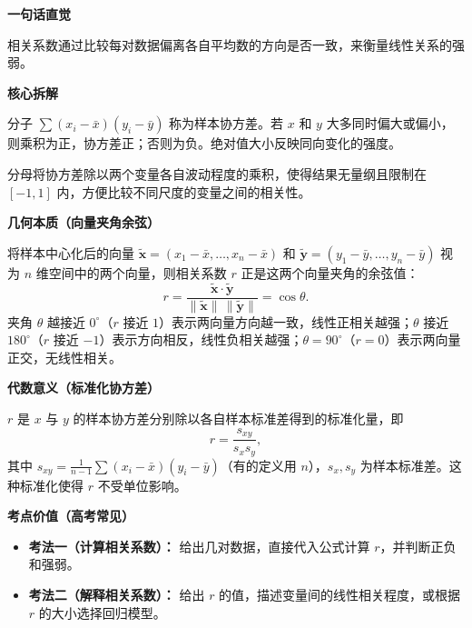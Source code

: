 \begin{explanationbox}
	\textbf{\textcolor{CExplanation}{一句话直觉}}

	相关系数通过比较每对数据偏离各自平均数的方向是否一致，来衡量线性关系的强弱。

	\medskip
	\textbf{\textcolor{CExplanation}{核心拆解}}
	\begin{description}[style=nextline, leftmargin=2.8em, labelsep=0.5em, itemsep=0.45em]
		\item[\textbf{要点一（协方差含义）：}] 分子 $\sum (x_i-\bar{x})(y_i-\bar{y})$ 称为样本协方差。若 $x$ 和 $y$ 大多同时偏大或偏小，则乘积为正，协方差正；否则为负。绝对值大小反映同向变化的强度。

		\item[\textbf{要点二（标准化作用）：}] 分母将协方差除以两个变量各自波动程度的乘积，使得结果无量纲且限制在 $[-1,1]$ 内，方便比较不同尺度的变量之间的相关性。
	\end{description}

	\medskip
	\textbf{\textcolor{CExplanation}{几何本质（向量夹角余弦）}}

	将样本中心化后的向量 $\tilde{\mathbf{x}}=(x_1-\bar{x},\dots,x_n-\bar{x})$ 和 $\tilde{\mathbf{y}}=(y_1-\bar{y},\dots,y_n-\bar{y})$ 视为 $n$ 维空间中的两个向量，则相关系数 $r$ 正是这两个向量夹角的余弦值：
	\[
		r = \frac{\tilde{\mathbf{x}}\cdot\tilde{\mathbf{y}}}{\|\tilde{\mathbf{x}}\|\,\|\tilde{\mathbf{y}}\|} = \cos\theta.
	\]
	夹角 $\theta$ 越接近 $0^\circ$（$r$ 接近 $1$）表示两向量方向越一致，线性正相关越强；$\theta$ 接近 $180^\circ$（$r$ 接近 $-1$）表示方向相反，线性负相关越强；$\theta=90^\circ$（$r=0$）表示两向量正交，无线性相关。

	\medskip
	\textbf{\textcolor{CExplanation}{代数意义（标准化协方差）}}

	$r$ 是 $x$ 与 $y$ 的样本协方差分别除以各自样本标准差得到的标准化量，即
	\[
		r = \frac{s_{xy}}{s_x s_y},
	\]
	其中 $s_{xy}=\frac1{n-1}\sum (x_i-\bar{x})(y_i-\bar{y})$（有的定义用 $n$），$s_x,s_y$ 为样本标准差。这种标准化使得 $r$ 不受单位影响。

	\medskip
	\textbf{\textcolor{CExplanation}{考点价值（高考常见）}}
	\begin{itemize}[leftmargin=*, itemsep=0.5em, topsep=0.4em]
		\item \textbf{考法一（计算相关系数）：} 给出几对数据，直接代入公式计算 $r$，并判断正负和强弱。

		\item \textbf{考法二（解释相关系数）：} 给出 $r$ 的值，描述变量间的线性相关程度，或根据 $r$ 的大小选择回归模型。
	\end{itemize}


\end{explanationbox}
